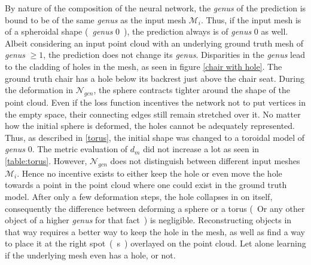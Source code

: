   By nature of the composition of the neural network, the \emph{genus} of the prediction is bound to be of the same \emph{genus} as the input mesh 
  $\mathcal{M}_i$. Thus, if the input mesh is of a spheroidal shape (~\emph{genus} 0~), the prediction always is of \emph{genus} 0 as well.
  Albeit considering an input point cloud with an underlying ground truth mesh of \emph{genus} $\geq 1$, the prediction does not change its \emph{genus}.
  Disparities in the \emph{genus} lead to the cladding of holes in the mesh, as seen in figure \ref{chair with hole}. The ground truth chair has a hole
  below its backrest just above the chair seat. During the deformation in $\mathcal{N}_{gcn}$, the sphere contracts tighter around the shape of the point
  cloud. Even if the loss function incentives the network not to put vertices in the empty space, their connecting edges still remain stretched over it.
  No matter how the initial sphere is deformed, the holes cannot be adequately represented. 
  Thus, as described in \ref{torus}, the initial shape was changed to a toroidal model of \emph{genus} 0. The metric evaluation of $d_m$ did not increase 
  a lot as seen in \ref{table:torus}. However, $\mathcal{N}_{gcn}$ does not distinguish between different input meshes $\mathcal{M}_i$. Hence no incentive
  exists to either keep the hole or even move the hole towards a point in the point cloud where one could exist in the ground truth model. After only a few 
  deformation steps, the hole collapses in on itself, consequently the difference between deforming a sphere or a torus (~Or any other object of a higher
  \emph{genus} for that fact~) is negligible. 
  Reconstructing objects in that way requires a better way to keep the hole in the mesh, as well as find a way to place it at the right spot~(~s~) overlayed 
  on the point cloud. Let alone learning if the underlying mesh even has a hole, or not.

